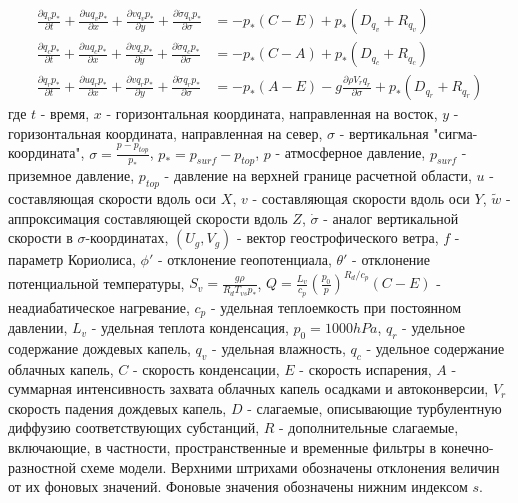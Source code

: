 \documentclass[12pt,a4paper]{report}
\begin{document}
\begin{subequations}
\begin{align}
\frac{\partial{q_vp_*}}{\partial{t}} + \frac{\partial{uq_vp_*}}{\partial{x}}+ \frac{\partial{vq_vp_*}}{\partial{y}}+ \frac{\partial{\dot{\sigma}q_vp_*}}{\partial{\sigma}}&=-p_*(C-E)+p_*(D_{q_v}+R_{q_v})\label{eq:progn6} \\
\frac{\partial{q_cp_*}}{\partial{t}} + \frac{\partial{uq_cp_*}}{\partial{x}}+ \frac{\partial{vq_cp_*}}{\partial{y}}+ \frac{\partial{\dot{\sigma}q_cp_*}}{\partial{\sigma}}&=-p_*(C-A)+p_*(D_{q_c}+R_{q_c})\label{eq:progn7} \\
\frac{\partial{q_rp_*}}{\partial{t}} + \frac{\partial{uq_rp_*}}{\partial{x}}+ \frac{\partial{vq_rp_*}}{\partial{y}}+ \frac{\partial{\dot{\sigma}q_rp_*}}{\partial{\sigma}}&=-p_*(A-E)-g\frac{\partial{\rho V_rq_r}}{\partial\sigma}+p_*(D_{q_r}+R_{q_r})\label{eq:progn8}
\end{align}
\end{subequations}
где $t$ - время, $x$ - горизонтальная координата, направленная на восток, $y$ - горизонтальная координата, направленная на север, $\sigma$ - вертикальная "сигма-координата", $\sigma=\frac{p-p_{top}}{p_*}$, $p_*=p_{surf}-p_{top}$, $p$ - атмосферное давление, $p_{surf}$ - приземное давление, $p_{top}$ - давление на верхней границе расчетной области, $u$ - составляющая скорости вдоль оси $X$, $v$ - составляющая скорости вдоль оси $Y$, $\tilde{w}$ - аппроксимация составляющей скорости вдоль $Z$, $\dot{\sigma}$ - аналог вертикальной скорости в $\sigma$-координатах, $(U_g,V_g)$ - вектор геострофического ветра, $f$ - параметр Кориолиса, $\phi'$ - отклонение геопотенциала, $\theta'$ - отклонение потенциальной температуры, $S_v=\frac{g\rho}{R_dT_{vs}p_*}$, $Q=\frac{L_v}{c_p}\left(\frac{p_0}{p}\right)^{R_d/c_p}(C-E)$ - неадиабатическое нагревание, $c_p$ - удельная теплоемкость при постоянном давлении, $L_v$ - удельная теплота конденсация, $p_0=1000 hPa$, $q_r$ - удельное содержание дождевых капель, $q_v$ - удельная влажность, $q_c$ - удельное содержание облачных капель, $C$ - скорость конденсации, $E$ - скорость испарения, $A$ - суммарная интенсивность захвата облачных капель осадками и автоконверсии, $V_r$ скорость падения дождевых капель, $D$ - слагаемые, описывающие турбулентную диффузию соответствующих субстанций, $R$ - дополнительные слагаемые, включающие, в частности, пространственные и временные фильтры в конечно-разностной схеме модели. Верхними штрихами обозначены отклонения величин от их фоновых значений. Фоновые значения обозначены нижним индексом $s$.
\end{document}
